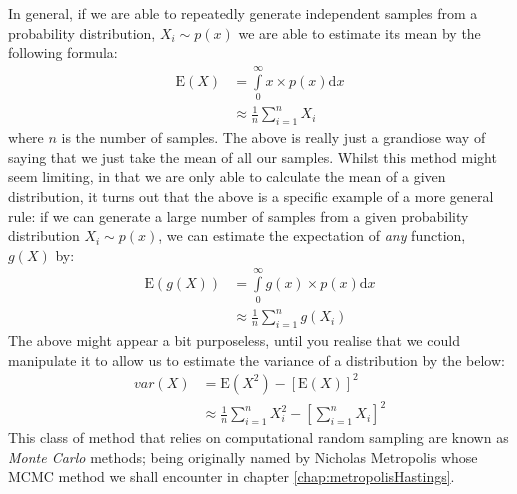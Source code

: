 \documentclass[11pt,fullpage]{book}
\begin{document}
In general, if we are able to repeatedly generate independent samples from a probability distribution, $X_i\sim p(x)$ we are able to estimate its mean by the following formula:
%
\begin{equation}
\begin{align}
\mathrm{E}(X) &= \int\limits_{0}^{\infty} x \times p(x) \mathrm{d}x\\
&\approx \frac{1}{n} \sum\limits_{i=1}^{n} X_i
\end{align}
\end{equation}
%
where $n$ is the number of samples. The above is really just a grandiose way of saying that we just take the mean of all our samples. Whilst this method might seem limiting, in that we are only able to calculate the mean of a given distribution, it turns out that the above is a specific example of a more general rule: if we can generate a large number of samples from a given probability distribution $X_i\sim p(x)$, we can estimate the expectation of \textit{any} function, $g(X)$ by:
%
\begin{equation}
\begin{align}
\mathrm{E}(g(X)) &= \int\limits_{0}^{\infty} g(x) \times p(x) \mathrm{d}x\\
&\approx \frac{1}{n} \sum\limits_{i=1}^{n} g(X_i)
\end{align}
\end{equation}
%
The above might appear a bit purposeless, until you realise that we could manipulate it to allow us to estimate the variance of a distribution by the below:
%
\begin{equation}
\begin{align}
var(X) &= \mathrm{E}(X^2) - \left[\mathrm{E}(X)\right]^2\\
&\approx \frac{1}{n} \sum\limits_{i=1}^{n} X_i^2 - \left[\sum\limits_{i=1}^{n} X_i\right]^2
\end{align}
\end{equation}
%
This class of method that relies on computational random sampling are known as \textit{Monte Carlo} methods; being originally named by Nicholas Metropolis whose MCMC method we shall encounter in chapter \ref{chap:metropolisHastings}. 
\end{document}
